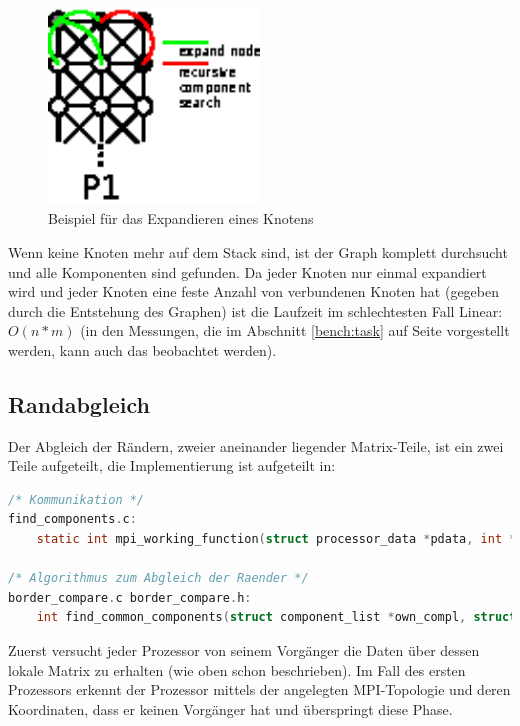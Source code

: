 \begin{figure}[tbhp]
	\centering
	\includegraphics[width=0.5\textwidth]{images/node_expand.eps}
	\caption{Beispiel für das Expandieren eines Knotens}
	\label{fig:node_expand}
\end{figure}

Wenn keine Knoten mehr auf dem Stack sind, ist der Graph komplett durchsucht und alle Komponenten sind gefunden. Da jeder Knoten nur einmal expandiert wird und jeder Knoten eine feste Anzahl von verbundenen Knoten hat (gegeben durch die Entstehung des Graphen) ist die Laufzeit im schlechtesten Fall Linear: $O(n*m)$ (in den Messungen, die im Abschnitt \ref{bench:task} auf Seite \pageref{bench:task} vorgestellt werden, kann auch das beobachtet werden).

\subsection{Randabgleich}

Der Abgleich der Rändern, zweier aneinander liegender Matrix-Teile, ist ein zwei Teile aufgeteilt, die Implementierung ist aufgeteilt in:

\begin{lstlisting}[language=C, aboveskip=\baselineskip, basicstyle=\footnotesize\ttfamily, lineskip=0pt]
/* Kommunikation */
find_components.c:
	static int mpi_working_function(struct processor_data *pdata, int *dims);

/* Algorithmus zum Abgleich der Raender */
border_compare.c border_compare.h:
	int find_common_components(struct component_list *own_compl, struct component_list *communication_compl, matrix_type *compare_border, matrix_type *send_border, matrix_type *alien_border);
\end{lstlisting}

Zuerst versucht jeder Prozessor von seinem Vorgänger die Daten über dessen lokale Matrix zu erhalten (wie oben schon beschrieben). Im Fall des ersten Prozessors erkennt der Prozessor mittels der angelegten MPI-Topologie und deren Koordinaten, dass er keinen Vorgänger hat und überspringt diese Phase.

